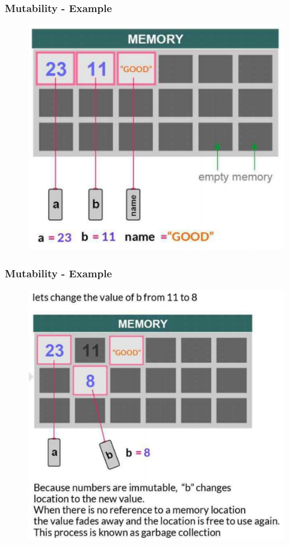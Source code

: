\documentclass[mini frame in current subsection]{beamer}
\begin{document}
		\begin{frame}
			\frametitle{Mutability - Example}
			\begin{figure}[h]
				\includegraphics[width=.8\textwidth]{mutable_first.png}
			\end{figure}
		\end{frame}
		
		\begin{frame}
			\frametitle{Mutability - Example}
			\begin{figure}[h]
				\includegraphics[width=.8\textwidth]{mutable_second.png}
			\end{figure}
		\end{frame}
		
\end{document}
